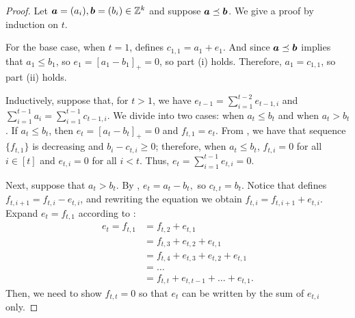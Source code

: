 \documentclass[runningheads]{llncs}
\begin{document}
\begin{proof}
Let $\boldsymbol a =(a_i), \boldsymbol b = (b_i)\in\mathbb Z^k$ and suppose $\boldsymbol a\preceq\boldsymbol b$. 
We give a proof by induction on $t$.

For the base case, when $t=1$,  defines $c_{1,1} = a_{1} + e_1$. 
And since $\boldsymbol a\preceq\boldsymbol b$ implies that $a_1\leq b_1$, so $e_1 = [a_1 - b_1]_+ = 0$, so part (i) holds.   
Therefore, $a_1 = c_{1,1}$, so part (ii) holds.


Inductively, suppose that, for  $t>1$, we have $e_{t-1} = \sum_{i=1}^{t-2} e_{t-1,i}$ and $\sum_{i=1}^{t-1} a_i = \sum_{i=1}^{t-1} c_{t-1,i}$. 
We divide into two cases: when $a_t\leq b_t$ and when $a_t>b_t$.
If $a_t\leq b_t$, then $e_t = [a_t - b_t]_+ =0$ and $f_{t,1} = e_t$. 
From , we have that sequence $\{f_{t,1}\}$ is decreasing and $b_i - c_{t,i}\geq 0$;
therefore, when $a_t\leq b_t$, $f_{t,i}= 0$ for all $i\in[t]$ and $e_{t,i} = 0$ for all $i<t$. 
Thus, $e_t = \sum_{i=1}^{t-1}  e_{t,i} = 0$. 

Next, suppose that $a_t > b_t$. By , $e_t = a_t - b_t,$ so $c_{t,t} = b_t$. 
Notice that  defines $f_{t,i+1} = f_{t,i}-e_{t,i}$, and rewriting the equation we obtain $f_{t,i} = f_{t,i+1}+e_{t,i}$. 
Expand $e_{t} = f_{t,1}$ according to : 
\begin{equation}\begin{split}
    e_t = f_{t,1}  & = f_{t,2} + e_{t,1} \\
    & = f_{t, 3} + e_{t,2} + e_{t,1} \\
    & = f_{t, 4} + e_{t,3} + e_{t,2} + e_{t,1} \\
    & = \dots\\
    & = f_{t,t} + e_{t, t-1} + \dots + e_{t,1}.
\end{split}\end{equation}
Then, we need to show $f_{t,t} =0 $ so that $e_t$ can be written by the sum of $e_{t,i}$ only. 


\end{proof}
\end{document}

